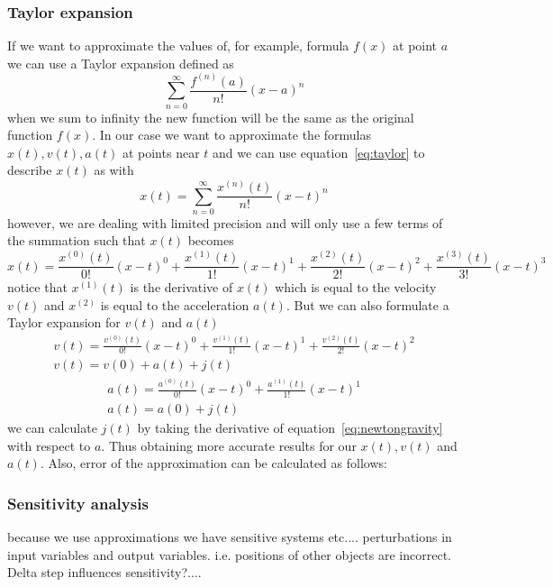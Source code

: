 \documentclass[11pt]{article} %
\begin{document}
\subsubsection{Taylor expansion}
If we want to approximate the values of, for example, formula $f(x)$ at point $a$ we can use a Taylor expansion defined as
\begin{equation}
    \label{eq:taylor}
    \sum^\infty_{n=0} \frac{f^{(n)}(a)}{n!}(x-a)^n
\end{equation}
when we sum to infinity the new function will be the same as the original function $f(x)$. In our case we want to approximate the formulas $x(t), v(t), a(t)$ at points near $t$ and we can use equation~\ref{eq:taylor} to describe $x(t)$ as with 
\begin{equation}
    x(t) = \sum^\infty_{n=0} \frac{x^{(n)}(t)}{n!}(x-t)^n
\end{equation}
however, we are dealing with limited precision and will only use a few terms of the summation such that $x(t)$ becomes
\begin{equation}
    x(t) =  \frac{x^{(0)}(t)}{0!}(x-t)^0 + \frac{x^{(1)}(t)}{1!}(x-t)^1 +\frac{x^{(2)}(t)}{2!}(x-t)^2 +\frac{x^{(3)}(t)}{3!}(x-t)^3
\end{equation}
notice that $x^{(1)}(t)$ is the derivative of $x(t)$ which is equal to the velocity $v(t)$ and $x^{(2)}$ is equal to the acceleration $a(t)$. But we can also formulate a Taylor expansion for $v(t)$ and $a(t)$
\begin{equation}
    \begin{split}
        v(t) =  \frac{v^{(0)}(t)}{0!}(x-t)^0 + \frac{v^{(1)}(t)}{1!}(x-t)^1 +\frac{v^{(2)}(t)}{2!}(x-t)^2\\
        v(t) = v(0) + a(t) + j(t)
    \end{split}
\end{equation}
\begin{equation}
    \begin{split}
        a(t) =  \frac{a^{(0)}(t)}{0!}(x-t)^0 + \frac{a^{(1)}(t)}{1!}(x-t)^1 \\
        a(t) =  a(0) + j(t) 
    \end{split}
\end{equation}
we can calculate $j(t)$ by taking the derivative of equation~\ref{eq:newtongravity} with respect to $a$. Thus obtaining more accurate results for our $x(t), v(t)$ and $a(t)$.
Also, error of the approximation can be calculated as follows:


\subsubsection{Sensitivity analysis}
because we use approximations we have sensitive systems etc....
perturbations in input variables and output variables. i.e. positions of other objects are incorrect.
Delta step influences sensitivity?....
\end{document}

